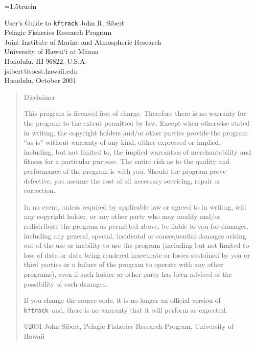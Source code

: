 \documentclass[12pt,draft,titlepage,twoside]{article}
\def\kftrack{\texttt{kftrack}}
\begin{document}
\begin{titlepage}
\hbox{}
\kern-1.25in
\epsfxsize=1.5truein


\vskip1.5in
\begin{center}
\LARGE{User's Guide to \texttt{kftrack}}
\vskip1in
\large{
John R. Sibert\\
Pelagic Fisheries Research Program\\
Joint Institute of Marine and Atmospheric Research\\
University of Hawai`i at M\={a}noa\\
Honolulu, HI  96822, U.S.A.\\
\bigskip					
jsibert@soest.hawaii.edu\\
\bigskip
Honolulu, October 2001\\
}
\end{center}
\end{titlepage}

\setcounter{page}{1}
\begin{quotation}
\begin{center}
{\LARGE Disclaimer}
\end{center}
\bigskip
This program is licensed free of charge. Therefore there is no warranty for the program
to the extent permitted by law. Except when otherwise stated in writing, the copyright holders 
and/or other parties provide the program ``as is'' without warranty of any kind, either expressed or implied, including, but not
limited to, the implied warranties of merchantability and fitness for a particular purpose. 
The entire risk as to
the quality and performance of the program is with you. 
Should the program prove defective, you assume the
cost of all necessary servicing, repair or correction. 

In no event, unless required by applicable law or agreed to in writing,
 will any copyright holder, or any
other party who may modify and/or redistribute the program as permitted above, be liable to you for damages,
including any general, special, incidental or consequential damages arising out of the use or inability to use
the program (including but not limited to loss of data or data being rendered inaccurate or losses sustained
by you or third parties or a failure of the program to operate with any other programs), even if such holder or
other party has been advised of the possibility of such damages.

If you change the source code, it is no longer an official version of \kftrack\ and,
there is no warranty that it will perform as expected.

\par\bigskip
\noindent \copyright 2001 John Sibert, Pelagic Fisheries Research Program, University of Hawaii

\end{quotation}\clearpage
{}
\setcounter{page}{1}
\end{document}
